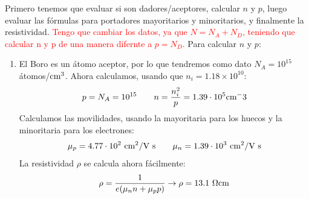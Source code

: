 Primero tenemos que evaluar si son dadores/aceptores, calcular $n$ y $p$, luego evaluar las fórmulas para portadores mayoritarios y minoritarios, y finalmente la resistividad. \textcolor{red}{Tengo que cambiar los datos, ya que $N=N_A+N_D$, teniendo que calcular n y p de una manera difernte a $p=N_D$.}  Para calcular $n$ y $p$:
\begin{enumerate}[label=\alph*)]
	\item El Boro es un átomo aceptor, por lo que tendremos como dato $N_A=10^{15} \ $átomos/$\text{cm}^3$. Ahora calculamos, usando que $n_i=1.18\times 10^{10}$:   
	\begin{equation}
		p = N_A = 10^{15} \qquad n = \frac{n_i^2}{p} =1.39 \cdot 10^5 \text{cm}^-3
	\end{equation}
	Calculamos las movilidades, usando la mayoritaria para los huecos y la minoritaria para los electrones:
	\begin{equation}
		\mu_p=4.77\cdot 10^2  \ \cm^2 /  \text{V s} \qquad 
		\mu_n=1.39 \cdot 10^3 \ \cm^2 /  \text{V s}
	\end{equation}
	La resistividad $\rho$ se calcula ahora fácilmente:
	\begin{equation}
		\rho = \frac{1}{e(\mu_n n + \mu_pp)} \rightarrow 
		\rho = 13.1 \ \Omega \text{cm}
	\end{equation}


\end{enumerate}
